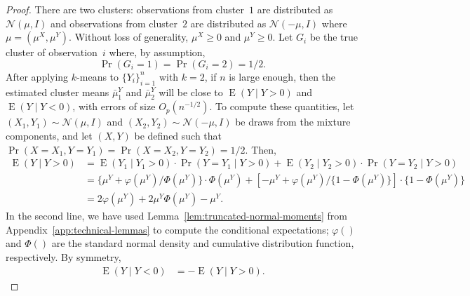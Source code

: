 \documentclass[12pt]{article}
\newcommand{\E}{\operatorname{E}}
\newcommand{\OhP}{O_p}
\newcommand{\muX}{\mu^{X}}
\newcommand{\muY}{\mu^{Y}}
\begin{document}
\begin{proof}
There are two clusters: observations from cluster~$1$ are distributed as
\(
  \mathcal{N}(\mu, I)
\)
and observations from cluster~$2$ are distributed as
\(
\mathcal{N}(-\mu, I)
\)
where $\mu = (\muX, \muY)$.  Without loss of generality, $\muX \geq 0$ and
$\muY \geq 0$.  Let $G_i$ be the true cluster of observation~$i$
where, by assumption,
\[
  \Pr(G_i=1) = \Pr(G_i=2) = 1/2.
\]
After applying $k$-means to $\{ Y_i\}_{i=1}^{n}$ with $k=2$, if $n$ is large
enough, then the estimated cluster means $\bar{\mu}^Y_1$ and $\bar{\mu}^Y_2$
will be close to $\E(Y \mid Y>0)$ and $\E(Y \mid Y < 0)$, with errors of
size $\OhP(n^{-1/2})$. To compute these quantities, let
$(X_1, Y_1) \sim \mathcal{N}(\mu, I)$ and $(X_2, Y_2) \sim \mathcal{N}(-\mu, I)$
be draws from the mixture components, and let $(X,Y)$ be defined such that
$\Pr(X= X_1, Y = Y_1) = \Pr(X= X_2, Y = Y_2) = 1/2$. Then,
\begin{align*}
  \E(Y \mid Y>0)
  &= \E(Y_1 \mid Y_1 > 0) \cdot \Pr(Y = Y_1 \mid Y >0)
   + \E(Y_2 \mid Y_2 > 0) \cdot \Pr(Y = Y_2 \mid Y > 0)
\\
&=  \{ \muY + \varphi(\muY) / \Phi(\muY) \} \cdot \Phi(\muY)
+ [-\muY + \varphi(\muY) / \{ 1 - \Phi(\muY) \}] \cdot \{ 1 - \Phi(\muY) \}
\\
  &= 2\varphi(\muY)+ 2\muY\Phi(\muY)- \muY. 
\end{align*}
In the second line, we have used
Lemma~\ref{lem:truncated-normal-moments} from
Appendix~\ref{app:technical-lemmas} to compute the conditional expectations;
$\varphi()$ and $\Phi()$ are the standard normal density and
cumulative distribution function, respectively. By symmetry,
\begin{align*}
  \E(Y \mid Y<0) &= -\E(Y \mid Y > 0).
\end{align*}



\end{proof}
\end{document}
